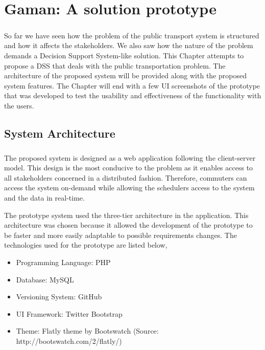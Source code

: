 
\chapter {Gaman: A solution prototype}
\label{chapter-SolutionPrototype}

\paragraph {} So far we have seen how the problem of the public transport system is structured and how it affects the stakeholders. We also saw how the nature of the problem demands a Decision Support System-like solution. This Chapter attempts to propose a DSS that deals with the public transportation problem. The architecture of the proposed system will be provided along with the proposed system features. The Chapter will end with a few UI screenshots of the prototype that was developed to test the usability and effectiveness of the functionality with the users.

\section{System Architecture}

\paragraph{ } The proposed system is designed as a web application following the client-server model. This design is the most conducive to the problem as it enables access to all stakeholders concerned in a distributed fashion. Therefore, commuters can access the system on-demand while allowing the schedulers access to the system and the data in real-time.

The prototype system used the three-tier architecture in the application. This architecture was chosen because it allowed the development of the prototype to be faster and more easily adaptable to possible requirements changes. The technologies used for the prototype are listed below,

\begin {itemize}
\item Programming Language: PHP
\item Database: MySQL
\item Versioning System: GitHub
\item UI Framework: Twitter Bootstrap
\item Theme: Flatly theme by Bootswatch (Source: http://bootswatch.com/2/flatly/)
\end {itemize}

